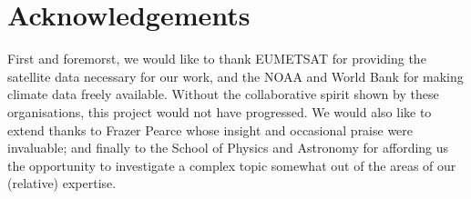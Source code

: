 \section*{Acknowledgements}


First and foremorst, we would like to thank EUMETSAT for providing the
satellite data necessary for our work, and the NOAA and World Bank for
making climate data freely available. Without the collaborative spirit
shown by these organisations, this project would not have
progressed. We would also like to extend thanks to Frazer Pearce whose
insight and occasional praise were invaluable; and finally to the
School of Physics and Astronomy for affording us the opportunity to
investigate a complex topic somewhat out of the areas of our
(relative) expertise.

